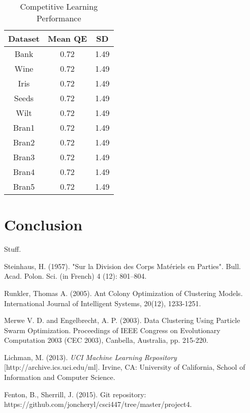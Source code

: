 \documentclass[conference]{IEEEtran}
\begin{document}
  \begin{table}[h]
  \caption{Competitive Learning Performance}
  \resizebox{1.3\textwidth}{!} {\begin{minipage}{\textwidth}
      
      \begin{tabular}{ c |c | c }
        Dataset & Mean QE & SD \\ \hline
        Bank & 0.72 & 1.49 \\
        Wine & 0.72 & 1.49 \\
        Iris & 0.72 & 1.49 \\
        Seeds & 0.72 & 1.49 \\
        Wilt & 0.72 & 1.49 \\
        Bran1 & 0.72 & 1.49 \\
        Bran2 & 0.72 & 1.49 \\
        Bran3 & 0.72 & 1.49 \\
        Bran4 & 0.72 & 1.49 \\
        Bran5 & 0.72 & 1.49
      \end{tabular}

      \label{table:clError}
  \end{minipage} }
  \end{table}
  
\section{Conclusion}
Stuff.

\begin{thebibliography}{1}

  Steinhaus, H. (1957). "Sur la Division des Corps Matériels en Parties". Bull. Acad. Polon. Sci. (in French) 4 (12): 801–804.

  Runkler, Thomas A. (2005). Ant Colony Optimization of Clustering Models. International Journal of Intelligent Systems, 20(12), 1233-1251.

  Merwe V. D. and Engelbrecht, A. P. (2003). Data Clustering Using Particle Swarm Optimization. Proceedings of IEEE Congress on Evolutionary Computation 2003 (CEC 2003), Canbella, Australia, pp. 215-220.

  Lichman, M. (2013). \textit{UCI Machine Learning Repository} [http://archive.ics.uci.edu/ml]. Irvine, CA: University of California, School of Information and Computer Science. 

  Fenton, B., Sherrill, J. (2015). Git repository: https://github.com/joncheryl/csci447/tree/master/project4.

\end{thebibliography}
\end{document}
